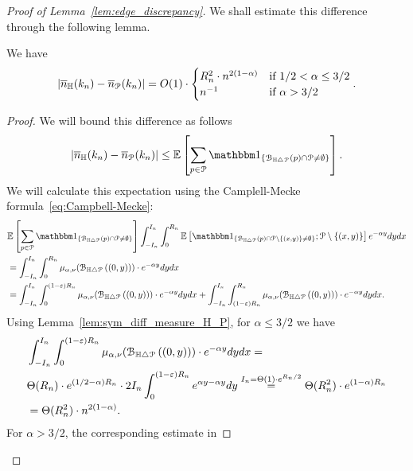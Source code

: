 \begin{proof}[Proof of Lemma~\ref{lem:edge_discrepancy}]
We shall estimate this difference through the following lemma. 
\begin{lemma} \label{lem:exps_difference}
We have 
$$|\overline{n}_{\mathbb{H}}(k_n) - \overline{n}_{{\mathcal P}}(k_n)| =O(1) \cdot  
\begin{cases} 
R_n^2 \cdot n^{2(1-\alpha)} & \mbox{if $1/2 <\alpha \leq 3/2$}\\
 n^{-1} &\mbox{if $\alpha > 3/2$}
\end{cases}.$$
\end{lemma}
\begin{proof} 
We will bound this difference as follows 
\begin{equation*}
\begin{split} 
|\expH - \expP| \leq \Exp{\sum_{p\in \Pcal} \ind{\BallSym{p}\cap \Pcal \not = \emptyset}}.
\end{split}
\end{equation*}
We will calculate this expectation using the Camplell-Mecke formula~\eqref{eq:Campbell-Mecke}:
\begin{equation*}
\begin{split} 
&\Exp{\sum_{p\in \Pcal} \ind{\BallSym{p}\cap \Pcal \not = \emptyset}} 
\int_{-I_n}^{I_n} \int_0^{R_n} 
\Exp{\ind{\BallSym{p}\cap \Pcal \setminus \{(x,y) \} \not = \emptyset} ; \Pcal \setminus \{(x,y)\}}  
e^{-\alpha y} dy dx \\
&=\int_{-I_n}^{I_n} \int_0^{R_n} \mu_{\alpha, \nu} (\BallSym{(0,y)})\cdot 
e^{-\alpha y} dy dx \\
&=\int_{-I_n}^{I_n} \int_0^{(1-\eps) R_n} \mu_{\alpha, \nu} (\BallSym{(0,y)})\cdot 
e^{-\alpha y} dy dx 
+\int_{-I_n}^{I_n} \int_{(1-\eps) R_n}^{R_n} \mu_{\alpha, \nu} (\BallSym{(0,y)})\cdot 
e^{-\alpha y} dy dx.
\end{split}
\end{equation*}
Using Lemma~\ref{lem:sym_diff_measure_H_P}, for $\alpha \leq 3/2$ we have 
\begin{equation*}
\begin{split}
&\int_{-I_n}^{I_n} \int_0^{(1-\varepsilon) R_n} \mu_{\alpha, \nu} ({\mathcal B}_{\mathbb{H} \bigtriangleup {\mathcal P}}\left((0,y)\right))\cdot 
e^{-\alpha y} dy dx  = \\
& \Theta (R_n) \cdot e^{(1/2-\alpha) R_n} \cdot 2 I_n \int_0^{(1-\varepsilon)R_n} 
e^{\alpha y -\alpha y} dy \stackrel{I_n = \Theta(1) \cdot e^{R_n/2}}{=} 
\Theta (R_n^2) \cdot e^{(1-\alpha )R_n}\\
&= \Theta (R_n^2) \cdot n^{2(1-\alpha)}. 
\end{split}
\end{equation*}
For $\alpha > 3/2$, the corresponding estimate in 

\end{proof}
\end{proof}

